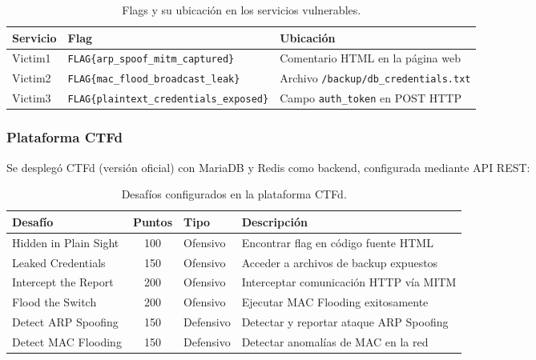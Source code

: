 \documentclass[12pt, a4paper]{article}
\begin{document}
\begin{table}[H]
    \centering
    \caption{Flags y su ubicaci\'on en los servicios vulnerables.}
    \label{tab:flags}
    \begin{tabularx}{\textwidth}{|l|l|X|}
        \hline
        \textbf{Servicio} & \textbf{Flag} & \textbf{Ubicaci\'on} \\
        \hline\hline
        Victim1 & \texttt{FLAG\{arp\_spoof\_mitm\_captured\}} & Comentario HTML en la p\'agina web \\
        \hline
        Victim2 & \texttt{FLAG\{mac\_flood\_broadcast\_leak\}} & Archivo \texttt{/backup/db\_credentials.txt} \\
        \hline
        Victim3 & \texttt{FLAG\{plaintext\_credentials\_exposed\}} & Campo \texttt{auth\_token} en POST HTTP \\
        \hline
    \end{tabularx}
\end{table}

\subsubsection{Plataforma CTFd}

Se despleg\'o CTFd (versi\'on oficial) con MariaDB y Redis como backend, configurada mediante API REST:

\begin{table}[H]
    \centering
    \caption{Desaf\'ios configurados en la plataforma CTFd.}
    \label{tab:challenges}
    \begin{tabularx}{\textwidth}{|l|c|l|X|}
        \hline
        \textbf{Desaf\'io} & \textbf{Puntos} & \textbf{Tipo} & \textbf{Descripci\'on} \\
        \hline\hline
        Hidden in Plain Sight & 100 & Ofensivo & Encontrar flag en c\'odigo fuente HTML \\
        \hline
        Leaked Credentials & 150 & Ofensivo & Acceder a archivos de backup expuestos \\
        \hline
        Intercept the Report & 200 & Ofensivo & Interceptar comunicaci\'on HTTP v\'ia MITM \\
        \hline
        Flood the Switch & 200 & Ofensivo & Ejecutar MAC Flooding exitosamente \\
        \hline
        Detect ARP Spoofing & 150 & Defensivo & Detectar y reportar ataque ARP Spoofing \\
        \hline
        Detect MAC Flooding & 150 & Defensivo & Detectar anomal\'ias de MAC en la red \\
        \hline
    \end{tabularx}
\end{table}
\end{document}
